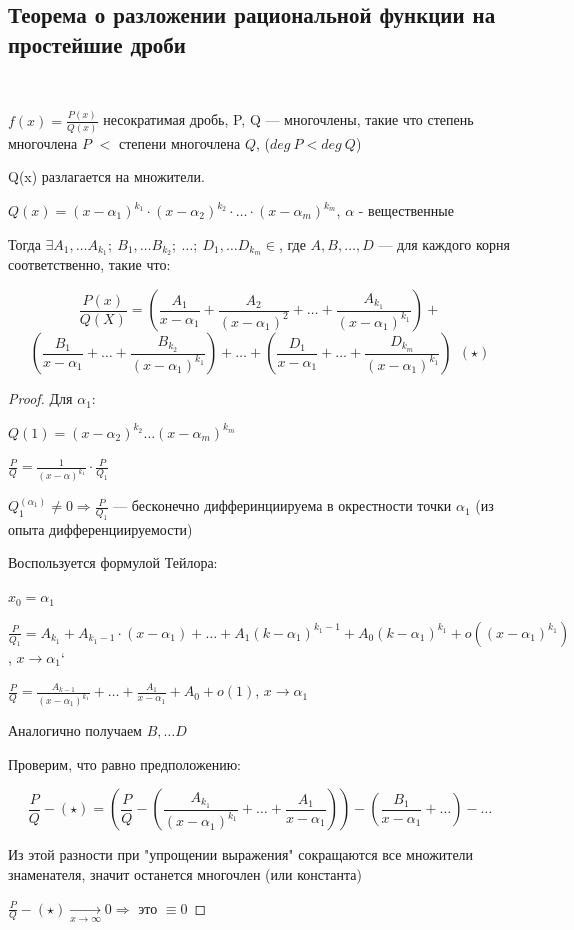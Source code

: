 \subsection{Теорема о разложении рациональной функции на простейшие дроби}$ $\\
\begin{theorem}
$f(x) = \frac{P(x)}{Q(x)}$ несократимая дробь, P, Q {---} многочлены, такие что степень многочлена $P$ $<$ степени многочлена $Q$, ($deg\ P < deg\ Q$)


Q(x) разлагается на множители.

$Q(x) = (x-\alpha_1)^{k_1} \cdot (x-\alpha_2)^{k_2} \cdot \dots \cdot (x-\alpha_m)^{k_m} $, $\alpha$ - вещественные


Тогда $\exists A_1, \dots A_{k_1};\ B_1, \dots B_{k_2};\ \dots;\ D_1, \dots D_{k_m} \in $, где $A, B, \dots, D$ --- для каждого корня соответственно, такие что:

$$\frac{P(x)}{Q(X)} = (\frac{A_1}{x-\alpha_1} + \frac{A_2}{(x-\alpha_1)^2} + \dots + \frac{A_{k_1}}{(x-\alpha_1)^{k_1}}) +$$
$$(\frac{B_1}{x-\alpha_1} + \dots + \frac{B_{k_2}}{(x-\alpha_1)^{k_1}}) + \dots +  (\frac{D_1}{x-\alpha_1} + \dots + \frac{D_{k_m}}{(x-\alpha_1)^{k_1}})\ \ (\star)$$
\end{theorem}
\begin{proof}
Для $\alpha_1$:

$\displaystyle Q(1)=(x-\alpha_2)^{k_2}\dots(x-\alpha_m)^{k_m}$

$\displaystyle\frac{P}{Q}=\frac{1}{(x-\alpha)^{k_1}}\cdot\frac{P}{Q_1}$

$\displaystyle Q_1^{(\alpha_1)} \neq 0 \Rightarrow \frac{P}{Q_1}$ {---} бесконечно дифферинциируема в окрестности точки $\alpha_1$ (из опыта дифференциируемости) 

Воспользуется формулой Тейлора:

$x_0=\alpha_1$

$\displaystyle \frac{P}{Q_1} = A_{k_1} + A_{k_{1} - 1}\cdot(x - \alpha_1) + \dots + A_1(k-\alpha_1)^{k_1 - 1} + A_0(k-\alpha_1)^{k_1} + o((x-\alpha_1)^{k_1})$, $x \to \alpha_1$`
 
$\displaystyle \frac{P}{Q} = \frac{A_{k-1}}{(x-\alpha_1)^{k_1}} + \dots + \frac{A_1}{x-\alpha_1}+A_0+o(1)$, $x\to\alpha_1$

Аналогично получаем $B, \dots D$

Проверим, что равно предположению:

$$\frac{P}{Q} - (\star) = (\frac{P}{Q} - (\frac{A_{k_1}}{(x-\alpha_1)^{k_1}} + \dots + \frac{A_1}{x-\alpha_1})) - (\frac{B_1}{x-\alpha_1} + \dots) - \dots$$ 

Из этой разности при "упрощении выражения" сокращаются все множители знаменателя, значит останется многочлен (или константа)

$\displaystyle\frac{P}{Q} - (\star) \xrightarrow[x\to \infty]{} 0 \Rightarrow$ это $ \equiv 0$


\end{proof}
\newpage
